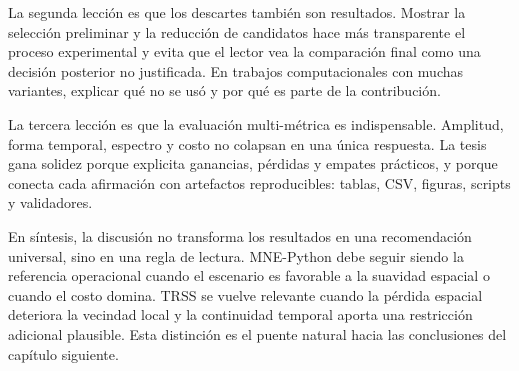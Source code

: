 La segunda lección es que los descartes también son resultados. Mostrar la selección preliminar y la reducción de candidatos hace más transparente el proceso experimental y evita que el lector vea la comparación final como una decisión posterior no justificada. En trabajos computacionales con muchas variantes, explicar qué no se usó y por qué es parte de la contribución.

La tercera lección es que la evaluación multi-métrica es indispensable. Amplitud, forma temporal, espectro y costo no colapsan en una única respuesta. La tesis gana solidez porque explicita ganancias, pérdidas y empates prácticos, y porque conecta cada afirmación con artefactos reproducibles: tablas, CSV, figuras, scripts y validadores.

En síntesis, la discusión no transforma los resultados en una recomendación universal, sino en una regla de lectura. MNE-Python debe seguir siendo la referencia operacional cuando el escenario es favorable a la suavidad espacial o cuando el costo domina. TRSS se vuelve relevante cuando la pérdida espacial deteriora la vecindad local y la continuidad temporal aporta una restricción adicional plausible. Esta distinción es el puente natural hacia las conclusiones del capítulo siguiente.
